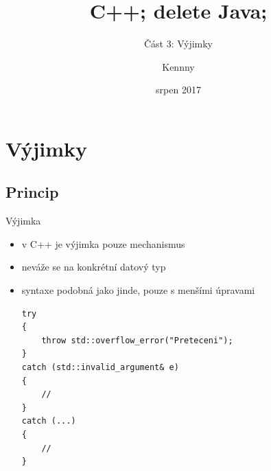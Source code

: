 \documentclass{beamer}
\begin{document}
\title{C++; delete Java;}
\subtitle{Část 3: Výjimky}
\author{Kennny}
\date{srpen 2017}

\frame{\titlepage}


\newenvironment{xframe}[1][]
  {\begin{frame}[fragile,environment=xframe,#1]}
  {\end{frame}}

\section{Výjimky}
\subsection{Princip}



\begin{xframe}{Výjimka}
	\begin{itemize}
		\item v C++ je výjimka pouze mechanismus
		\item neváže se na konkrétní datový typ
		\item syntaxe podobná jako jinde, pouze s menšími úpravami
\begin{lstlisting}[basicstyle=\fontsize{8}{9}\selectfont\ttfamily]
try
{
    throw std::overflow_error("Preteceni");
}
catch (std::invalid_argument& e)
{
    //
}
catch (...)
{
    //
}
\end{lstlisting}
	\end{itemize}
\end{xframe}
\end{document}
